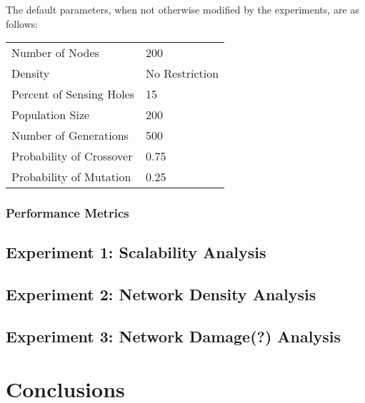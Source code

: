 \documentclass[conference]{IEEEtran}
\begin{document}
The default parameters, when not otherwise modified by the experiments, are as follows: 
\begin{table}[h]
\begin{tabular}{ll}
Number of Nodes &	200 \\
Density &  No Restriction \\
Percent of Sensing Holes & 15 \\
Population Size & 200 \\
Number of Generations &  500 \\
Probability of Crossover & 0.75 \\ 
Probability of Mutation & 0.25 \\
\end{tabular}
\end{table}

\subsubsection{Performance Metrics}
\label{sec:Experiments:Metrics}

\subsection{Experiment 1: Scalability Analysis}
\label{sec:Simulations:Experiment1}

\subsection{Experiment 2: Network Density Analysis}
\label{sec:Simulations:Experiment2}

\subsection{Experiment 3: Network Damage(?) Analysis}
\label{sec:Simulations:Experiment3}


\section{Conclusions}
\label{sec:Conclusions}




\end{document}
